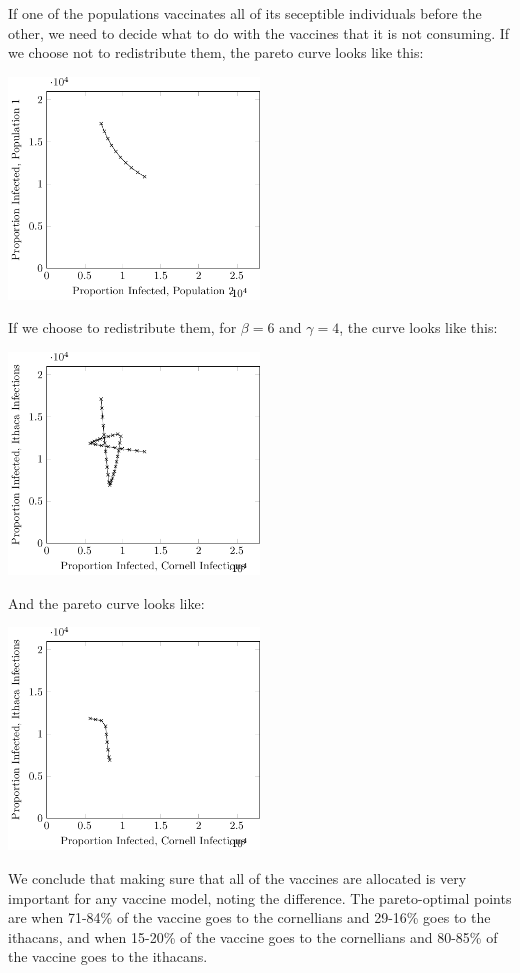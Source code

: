 \documentclass{article}
\begin{document}
If one of the populations vaccinates all of its seceptible individuals
	before the other, we need to decide what to do with the vaccines
	that it is not consuming.
If we choose not to redistribute them, the pareto curve looks like this:

\includegraphics[width=0.5\textwidth]{figures/sir-pareto.pdf}

If we choose to redistribute them, for $\beta = 6$ and $\gamma = 4$,
	the curve looks like this:

\includegraphics[width=0.5\textwidth]{figures/sir-pareto-top.pdf}

And the pareto curve looks like:

\includegraphics[width=0.5\textwidth]{figures/sir-pareto-top-pareto.pdf}

We conclude that making sure that all of the vaccines are allocated is very
	important for any vaccine model, noting the difference.
The pareto-optimal points are when 71-84\% of the vaccine goes to the
	cornellians and 29-16\% goes to the ithacans, 
	and when 15-20\% of the vaccine goes to the cornellians 
	and 80-85\% of the vaccine goes to the ithacans.
\end{document}
